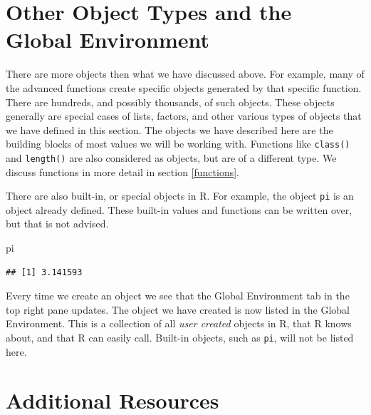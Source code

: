 \documentclass[
]{book}
\newenvironment{Shaded}{\begin{snugshade}}{\end{snugshade}}
\newcommand{\NormalTok}[1]{#1}
\begin{document}
\hypertarget{other-object-types-and-the-global-environment}{%
\section{Other Object Types and the Global Environment}\label{other-object-types-and-the-global-environment}}

There are more objects then what we have discussed above. For example, many of the advanced functions create specific objects generated by that specific function. There are hundreds, and possibly thousands, of such objects. These objects generally are special cases of lists, factors, and other various types of objects that we have defined in this section. The objects we have described here are the building blocks of most values we will be working with. Functions like \texttt{class()} and \texttt{length()} are also considered as objects, but are of a different type. We discuss functions in more detail in section \ref{functions}.

There are also built-in, or special objects in R. For example, the object \texttt{pi} is an object already defined. These built-in values and functions can be written over, but that is not advised.

\begin{Shaded}
\begin{Highlighting}[]
\NormalTok{pi}
\end{Highlighting}
\end{Shaded}

\begin{verbatim}
## [1] 3.141593
\end{verbatim}

Every time we create an object we see that the Global Environment tab in the top right pane updates. The object we have created is now listed in the Global Environment. This is a collection of all \emph{user created} objects in R, that R knows about, and that R can easily call. Built-in objects, such as \texttt{pi}, will not be listed here.

\hypertarget{additional-resources-1}{%
\section{Additional Resources}\label{additional-resources-1}}
\end{document}
